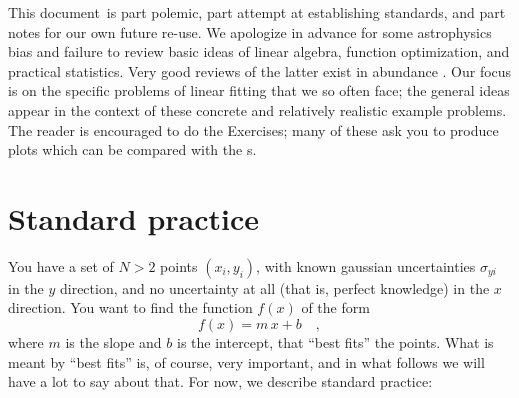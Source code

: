 \documentclass[12pt,twoside]{article}
\newcommand{\documentname}{document}
\newcommand{\problemname}{Exercise}
\newcounter{problem}
\begin{document}
This \documentname\ is part polemic, part attempt at establishing standards,
and part notes for our own future re-use.  We apologize in advance for
some astrophysics bias and failure to review basic ideas of linear
algebra, function optimization, and practical statistics.  Very good
reviews of the latter exist in abundance \citep{jaynes,mackay,press}.
Our focus is on the specific problems of linear fitting that we so
often face; the general ideas appear in the context of these concrete
and relatively realistic example problems.  The reader is encouraged
to do the \problemname s; many of these ask you to produce plots which
can be compared with the \figurename s.

\section{Standard practice}\label{sec:standard}

You have a set of $N>2$ points $(x_i,y_i)$, with known gaussian
uncertainties $\sigma_{yi}$ in the $y$ direction, and no uncertainty
at all (that is, perfect knowledge) in the $x$ direction.  You want to
find the function $f(x)$ of the form
\begin{equation}\label{eq:fofx}
f(x) = m\,x + b \quad ,
\end{equation}
where $m$ is the slope and $b$ is the intercept, that ``best fits''
the points.  What is meant by ``best fits'' is, of course, very
important, and in what follows we will have a lot to say about that.
For now, we describe standard practice:
\end{document}

